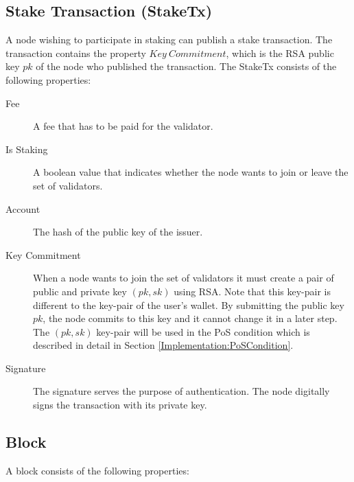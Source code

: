 \documentclass[12pt,a4]{article}
\begin{document}
\subsection{Stake Transaction (StakeTx)}
\label{Implementation:StakeTx}

A node wishing to participate in staking can publish a stake transaction. The transaction contains the property $Key\ Commitment$, which is the RSA public key $pk$ of the node who published the transaction. The StakeTx consists of the following properties:

\begin{description}
  \item[Fee] A fee that has to be paid for the validator.
  \item[Is Staking] A boolean value that indicates whether the node wants to join or leave the set of validators.
  \item[Account] The hash of the public key of the issuer.
  \item[Key Commitment] When a node wants to join the set of validators it must create a pair of public and private key $(pk, sk)$ using RSA. Note that this key-pair is different to the key-pair of the user's wallet. By submitting the public key $pk$, the node commits to this key and it cannot change it in a later step. The $(pk, sk)$ key-pair will be used in the PoS condition which is described in detail in Section \ref{Implementation:PoSCondition}.
  \item[Signature] The signature serves the purpose of authentication. The node digitally signs the transaction with its private key.
\end{description}

\subsection{Block}

A block consists of the following properties:
\end{document}
